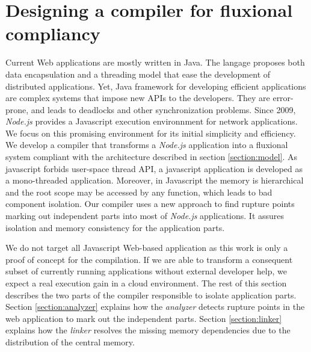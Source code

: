 \section{Designing a compiler for fluxional compliancy} \label{section:compiler}

Current Web applications are mostly written in Java. The langage proposes both data encapsulation and a threading model that ease the development of distributed applications.
Yet, Java framework for developing efficient applications are complex systems that impose new APIs\cite{Coward2003} to the developers.
They are error-prone, and leads to deadlocks and other synchronization problems.
Since 2009, \textit{Node.js}\cite{Dahl} provides a Javascript execution environnment for network applications.
We focus on this promising environment for its initial simplicity and efficiency.
We develop a compiler that transforms a \textit{Node.js} application into a fluxional system compliant with the architecture described in section \ref{section:model}.
As javascript forbids user-space thread API, a javascript application is developed as a mono-threaded application.
Moreover, in Javascript  the memory is hierarchical and the root scope may be accessed by any function, which leads to bad component isolation.
Our compiler uses a new approach to find rupture points marking out independent parts into most of \textit{Node.js} applications.
It assures isolation and memory consistency for the application parts.

We do not target all Javascript Web-based application as this work is only a proof of concept for the compilation.
If we are able to transform a consequent subset of currently running applications without external developer help, we expect a real execution gain in a cloud environment.
The rest of this section describes the two parts of the compiler responsible to isolate application parts.
Section \ref{section:analyzer} explains how the \textit{analyzer} detects rupture points in the web application to mark out the independent parts.
Section \ref{section:linker} explains how the \textit{linker} resolves the missing memory dependencies due to the distribution of the central memory.

